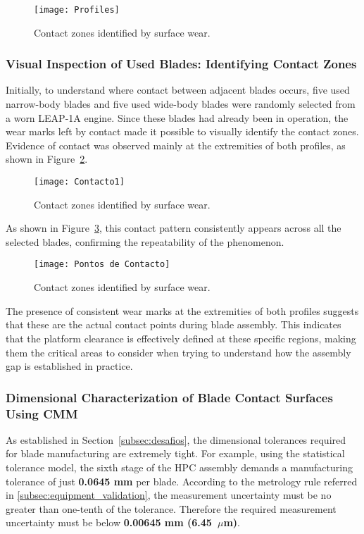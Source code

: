 \begin{figure}[H]
    \centering
    \texttt{[image: Profiles]}
    \caption{Contact zones identified by surface wear.}
    \label{fig:profiles}
\end{figure}


\subsubsection{Visual Inspection of Used Blades: Identifying Contact Zones}
\label{cha:iv}

Initially, to understand where contact between adjacent blades occurs, five used narrow-body blades and five used wide-body blades were randomly selected from a worn LEAP-1A engine. Since these blades had already been in operation, the wear marks left by contact made it possible to visually identify the contact zones. Evidence of contact was observed mainly at the extremities of both profiles, as shown in Figure~\ref{fig:contacto1}.

\begin{figure}[H]
    \centering
    \texttt{[image: Contacto1]}
    \caption{Contact zones identified by surface wear.}
    \label{fig:contacto1}
\end{figure}

As shown in Figure~\ref{fig:contact}, this contact pattern consistently appears across all the selected blades, confirming the repeatability of the phenomenon. 

\begin{figure}[H]
    \centering
    \texttt{[image: Pontos de Contacto]}
    \caption{Contact zones identified by surface wear.}
    \label{fig:contact}
\end{figure}

The presence of consistent wear marks at the extremities of both profiles suggests that these are the actual contact points during blade assembly. This indicates that the platform clearance is effectively defined at these specific regions, making them the critical areas to consider when trying to understand how the assembly gap is established in practice.

\subsubsection{Dimensional Characterization of Blade Contact Surfaces Using CMM}
\label{cha:contactocmm}

As established in Section~\ref{subsec:desafios}, the dimensional tolerances required for blade manufacturing are extremely tight. For example, using the statistical tolerance model, the sixth stage of the HPC assembly demands a manufacturing tolerance of just \textbf{0.0645 mm} per blade. According to the metrology rule referred in \ref{subsec:equipment_validation}, the measurement uncertainty must be no greater than one-tenth of the tolerance. Therefore the required measurement uncertainty must be below \textbf{0.00645 mm (6.45~$\mu$m)}.

